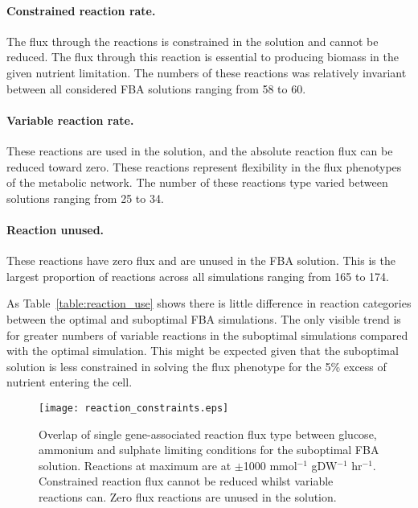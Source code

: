 \paragraph{Constrained reaction rate.} The flux through the reactions is constrained in the solution and cannot be reduced. The flux through this reaction is essential to producing biomass in the given nutrient limitation. The numbers of these reactions was relatively invariant between all considered FBA solutions ranging from 58 to 60.

\paragraph{Variable reaction rate.} These reactions are used in the solution, and the absolute reaction flux can be reduced toward zero. These reactions represent flexibility in the flux phenotypes of the metabolic network. The number of these reactions type varied between solutions ranging from 25 to 34.

\paragraph{Reaction unused.} These reactions have zero flux and are unused in the FBA solution. This is the largest proportion of reactions across all simulations ranging from 165 to 174.

As Table~\vref{table:reaction_use} shows there is little difference in reaction categories between the optimal and suboptimal FBA simulations. The only visible trend is for greater numbers of variable reactions in the suboptimal simulations compared with the optimal simulation. This might be expected given that the suboptimal solution is less constrained in solving the flux phenotype for the 5\% excess of nutrient entering the cell.

\begin{figure}%
  \centering
  \texttt{[image: reaction\_constraints.eps]}
  \caption[Overlap of reaction type between glucose, ammonium and sulphate limiting conditions]{Overlap of single gene-associated reaction flux type between glucose, ammonium and sulphate limiting conditions for the suboptimal FBA solution. Reactions at maximum are at $\pm$1000 mmol$^{-1}$ gDW$^{-1}$ hr$^{-1}$. Constrained reaction flux cannot be reduced whilst variable reactions can. Zero flux reactions are unused in the solution. }
  \label{figure:reaction_constraints}
\end{figure}%

